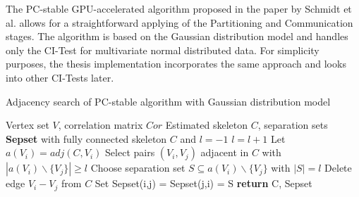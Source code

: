 The PC-stable GPU-accelerated algorithm proposed in the paper by Schmidt et al. \cite{schmidtOrderIndependentConstraintBasedCausal2018} allows for a straightforward applying of the Partitioning and Communication stages. The algorithm is based on the Gaussian distribution model and handles only the CI-Test for multivariate normal distributed data. For simplicity purposes, the thesis implementation incorporates the same approach and looks into other CI-Tests later.

\begin{algorithm}
    \caption{Adjacency search of PC-stable algorithm with Gaussian distribution model \cite{schmidtOrderIndependentConstraintBasedCausal2018, colomboOrderIndependentConstraintBasedCausal2014}}
    \label{alg:pcstable_gaussian}
    \begin{algorithmic}[1]
    \Require Vertex set $V$, correlation matrix $Cor$
    \Ensure Estimated skeleton $C$, separation sets \textbf{Sepset}
    \State with fully connected skeleton $C$ and $l = -1$
    \Repeat \label{alg:pcstable_gaussian:level_loop}
        \State $l=l+1$
            \State Let $a(V_i) = adj(C,V_i)$ \label{alg:pcstable_gaussian:adj}
        \EndFor
        \Repeat \label{alg:pcstable_gaussian:edge_loop}
            \State Select pairs $(V_i,V_j)$ adjacent in $C$ with $|a(V_i)\backslash\{V_j\}| \geq l$
            \Repeat \label{alg:pcstable_gaussian:sepset_loop}
                \State Choose separation set $S \subseteq a(V_i ) \backslash \{V_j\}$ with $| S | = l$
                    \State Delete edge $V_i - V_j$ from $C$
                    \State Set Sepset(i,j) = Sepset(j,i) = S
                \EndIf
    \State \textbf{return} C, Sepset
    \end{algorithmic}
\end{algorithm}

